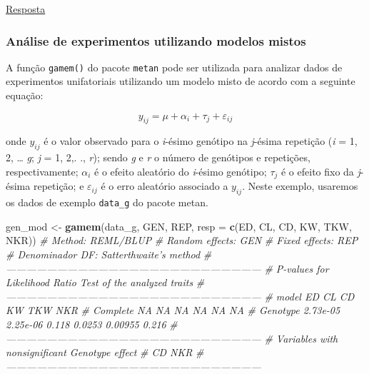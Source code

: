\documentclass[
]{book}
\newenvironment{Shaded}{\begin{snugshade}}{\end{snugshade}}
\newcommand{\CommentTok}[1]{\textcolor[rgb]{0.56,0.35,0.01}{\textit{#1}}}
\newcommand{\DataTypeTok}[1]{\textcolor[rgb]{0.13,0.29,0.53}{#1}}
\newcommand{\KeywordTok}[1]{\textcolor[rgb]{0.13,0.29,0.53}{\textbf{#1}}}
\newcommand{\NormalTok}[1]{#1}
\newcommand{\StringTok}[1]{\textcolor[rgb]{0.31,0.60,0.02}{#1}}
\begin{document}
\protect\hyperlink{exerc9}{Resposta}

\hypertarget{anuxe1lise-de-experimentos-utilizando-modelos-mistos}{%
\subsubsection{Análise de experimentos utilizando modelos mistos}\label{anuxe1lise-de-experimentos-utilizando-modelos-mistos}}

A função \texttt{gamem()} do pacote \texttt{metan} pode ser utilizada para analizar dados de experimentos unifatoriais utilizando um modelo misto de acordo com a seguinte equação:

\[
y_{ij}= \mu  + \alpha_i + \tau_j + \varepsilon_{ij}
\]

onde \(y_ {ij}\) é o valor observado para o \emph{i}-ésimo genótipo na \emph{j}-ésima repetição (\emph{i} = 1, 2, \ldots{} \emph{g}; \emph{j} = 1, 2,. ., \emph{r}); sendo \emph{g} e \emph{r} o número de genótipos e repetições, respectivamente; \(\alpha_i\) é o efeito aleatório do \emph{i}-ésimo genótipo; \(\tau_j\) é o efeito fixo da \emph{j}-ésima repetição; e \(\varepsilon_ {ij}\) é o erro aleatório associado a \(y_{ij}\). Neste exemplo, usaremos os dados de exemplo \texttt{data\_g} do pacote metan.

\begin{Shaded}
\begin{Highlighting}[]
\NormalTok{gen_mod <-}\StringTok{ }\KeywordTok{gamem}\NormalTok{(data_g, GEN, REP,}
                 \DataTypeTok{resp =} \KeywordTok{c}\NormalTok{(ED, CL, CD, KW, TKW, NKR))}
\CommentTok{# Method: REML/BLUP}
\CommentTok{# Random effects: GEN}
\CommentTok{# Fixed effects: REP}
\CommentTok{# Denominador DF: Satterthwaite's method}
\CommentTok{# ---------------------------------------------------------------------------}
\CommentTok{# P-values for Likelihood Ratio Test of the analyzed traits}
\CommentTok{# ---------------------------------------------------------------------------}
\CommentTok{#     model       ED       CL    CD     KW     TKW   NKR}
\CommentTok{#  Complete       NA       NA    NA     NA      NA    NA}
\CommentTok{#  Genotype 2.73e-05 2.25e-06 0.118 0.0253 0.00955 0.216}
\CommentTok{# ---------------------------------------------------------------------------}
\CommentTok{# Variables with nonsignificant Genotype effect}
\CommentTok{# CD NKR }
\CommentTok{# ---------------------------------------------------------------------------}
\end{Highlighting}
\end{Shaded}
\end{document}
